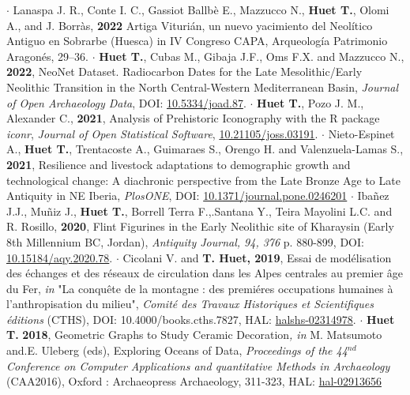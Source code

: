 \documentclass{article}
\begin{document}
\smallbreak
$\cdot$ Lanaspa J. R., Conte I. C., Gassiot Ballbè E., Mazzucco N., \textbf{Huet T.}, Olomi A., and J. Borràs, \textbf{2022} Artiga Viturián, un nuevo yacimiento del Neolítico Antiguo en Sobrarbe (Huesca) in IV Congreso CAPA, Arqueología Patrimonio Aragonés, 29–36.
\smallbreak
$\cdot$ \textbf{Huet T.}, Cubas M., Gibaja J.F., Oms F.X. and Mazzucco N., \textbf{2022}, NeoNet Dataset. Radiocarbon Dates for the Late Mesolithic/Early Neolithic Transition in the North Central-Western Mediterranean Basin, \textit{Journal of Open Archaeology Data}, DOI: \href{http://doi.org/10.5334/joad.87}{10.5334/joad.87}.
\smallbreak
$\cdot$ \textbf{Huet T.}, Pozo J. M., Alexander C., \textbf{2021}, Analysis of Prehistoric Iconography with the R package \textit{iconr}, \textit{Journal of Open Statistical Software}, \href{https://joss.theoj.org/papers/10.21105/joss.03191}{10.21105/joss.03191}.
\smallbreak
$\cdot$ Nieto-Espinet A., \textbf{Huet T.}, Trentacoste A., Guimaraes S., Orengo H. and Valenzuela-Lamas S., \textbf{2021}, Resilience and livestock adaptations to demographic growth and technological change: A diachronic perspective from the Late Bronze Age to Late Antiquity in NE Iberia, \textit{PlosONE}, DOI: \href{https://doi.org/10.1371/journal.pone.0246201}{10.1371/journal.pone.0246201}
\smallbreak
$\cdot$ Iba\~{n}ez J.J., Mu\~{n}iz J., \textbf{Huet T.}, Borrell Terra F.,.Santana Y., Teira Mayolini L.C. and R. Rosillo, \textbf{2020}, Flint Figurines in the Early Neolithic site of Kharaysin (Early 8th Millennium BC, Jordan), \textit{Antiquity Journal, 94, 376} p. 880-899, DOI: \href{https://doi.org/10.15184/aqy.2020.78}{10.15184/aqy.2020.78}.
\smallbreak
$\cdot$ Cicolani V. and \textbf{T. Huet, 2019}, Essai de mod\'{e}lisation des \'{e}changes et des r\'{e}seaux de circulation dans les Alpes centrales au premier \^{a}ge du Fer, \textit{in} "La conqu\^{e}te de la montagne : des premi\'{e}res occupations humaines \`{a} l'anthropisation du milieu", \textit{Comit\'{e} des Travaux Historiques et Scientifiques \'{e}ditions} (CTHS), DOI: 10.4000/books.cths.7827, HAL: \href{https://halshs.archives-ouvertes.fr/halshs-02314978/document}{halshs-02314978}.
\smallbreak
$\cdot$ \textbf{Huet T.} \textbf{2018}, Geometric Graphs to Study Ceramic Decoration\textit{, in} M. Matsumoto and.E. Uleberg (eds), Exploring Oceans of Data, \textit{Proceedings of the 44${}^{nd\ }$Conference on Computer Applications and quantitative Methods in Archaeology} (CAA2016), Oxford : Archaeopress Archaeology, 311-323, HAL: \href{https://hal.archives-ouvertes.fr/hal-02913656}{hal-02913656}
\smallbreak
\end{document}
